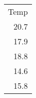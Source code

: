 \begin{tabular}{r}
\toprule
 Temp \\
 20.7 \\
\midrule
 17.9 \\
 18.8 \\
 14.6 \\
 15.8 \\
\bottomrule
\end{tabular}
